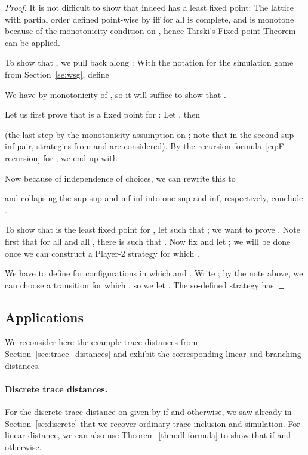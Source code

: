 \documentclass[copyright,creativecommons,sharealike]{eptcs}
\theoremstyle{plain}
\begin{document}
\begin{proof}
  It is not difficult to show that  indeed has a least fixed point:
  The lattice  with partial order defined point-wise
  by  iff  for all 
  is complete, and  is monotone because of the monotonicity
  condition on , hence Tarski's Fixed-point Theorem can be applied.

  To show that , we pull back  along : With
  the notation for the simulation game from Section~\ref{se:wsg},
  define
  
  We have  by monotonicity of , so it will suffice
  to show that .

  Let us first prove that  is a fixed point for : Let , then
  
  (the last step by the monotonicity assumption on ; note that in
  the second sup-inf pair, strategies from  and  are
  considered).  By the recursion formula~\eqref{eq:F-recursion} for
  , we end up with
  
  Now because of independence of choices, we can rewrite this to
  
  and collapsing the sup-sup and inf-inf into one sup and inf,
  respectively, conclude .

  To show that  is the least fixed point for , let  such that ; we want to prove
  .  Note first that for all  and all , there is  such that .  Now fix  and let ; we will be done once we can construct a Player-2 strategy
   for which .

  We have to define  for configurations  in which  and .  Write ; by the note above, we can choose a transition  for which ,
  so we let .  The
  so-defined strategy has
  
\end{proof}

\subsection{Applications}
\label{se:applications}

We reconsider here the example trace distances from
Section~\ref{sec:trace_distances} and exhibit the corresponding linear
and branching distances.

\paragraph{Discrete trace distances.}

For the discrete trace distance on  given by  if  and 
otherwise, we saw already in Section~\ref{se:discrete} that we recover
ordinary trace inclusion and simulation.  For linear distance, we can
also use Theorem~\ref{thm:dl-formula} to show that  if
 and  otherwise.
\end{document}
